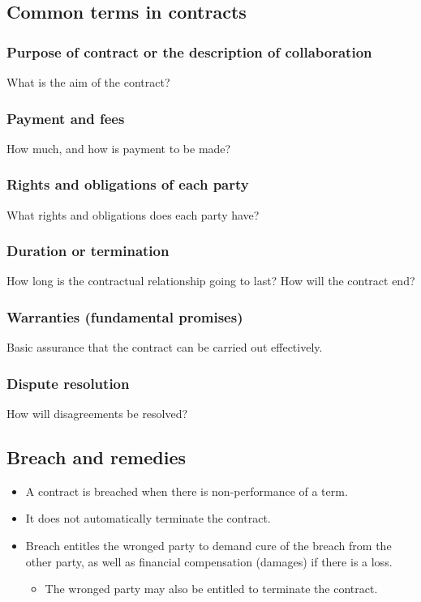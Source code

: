 \documentclass[11pt]{article}
\begin{document}
\subsection{Common terms in contracts}
\label{sec:orgc6d14d8}

\subsubsection{Purpose of contract or the description of collaboration}
\label{sec:org245709f}
What is the aim of the contract?
\subsubsection{Payment and fees}
\label{sec:orgc18745f}
How much, and how is payment to be made?
\subsubsection{Rights and obligations of each party}
\label{sec:orgd761ff8}
What rights and obligations does each party have?
\subsubsection{Duration or termination}
\label{sec:orge1bebb2}
How long is the contractual relationship going to last? How will the contract end?
\subsubsection{Warranties (fundamental promises)}
\label{sec:org29bf04f}
Basic assurance that the contract can be carried out effectively.
\subsubsection{Dispute resolution}
\label{sec:orgc80e8f6}
How will disagreements be resolved?
\subsection{Breach and remedies}
\label{sec:org526b437}
\begin{itemize}
\item A contract is breached when there is non-performance of a term.
\item It does not automatically terminate the contract.
\item Breach entitles the wronged party to demand cure of the breach from the other party, as well as financial compensation (damages) if there is a loss.
\begin{itemize}
\item The wronged party may also be entitled to terminate the contract.
\end{itemize}
\end{itemize}
\end{document}
